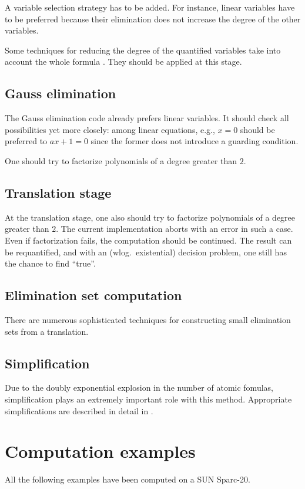 A variable selection strategy has to be added. For instance, linear
variables have to be preferred because their elimination does not
increase the degree of the other variables.

Some techniques for reducing the degree of the quantified variables
take into account the whole formula \cite{DSW:96}. They should be
applied at this stage.
%
\subsection{Gauss elimination}
The Gauss elimination code already prefers linear variables. It should
check all possibilities yet more closely: among linear equations,
e.g., $x=0$ should be preferred to $ax+1=0$ since the former does not
introduce a guarding condition.

One should try to factorize polynomials of a degree greater than $2$.
%
\subsection{Translation stage}
At the translation stage, one also should try to factorize polynomials
of a degree greater than $2$. The current implementation aborts with
an error in such a case. Even if factorization fails, the computation
should be continued. The result can be requantified, and with an
(wlog.~existential) decision problem, one still has the chance to find
``true''.
%
\subsection{Elimination set computation}
There are numerous sophisticated techniques for constructing small
elimination sets from a translation.
%
\subsection{Simplification}
Due to the doubly exponential explosion in the number of atomic
fomulas, simplification plays an extremely important role with this
method. Appropriate simplifications are described in detail in
\cite{DolzmannSturm:95}.
%
\section{Computation examples}
All the following examples have been computed on a SUN Sparc-20.
